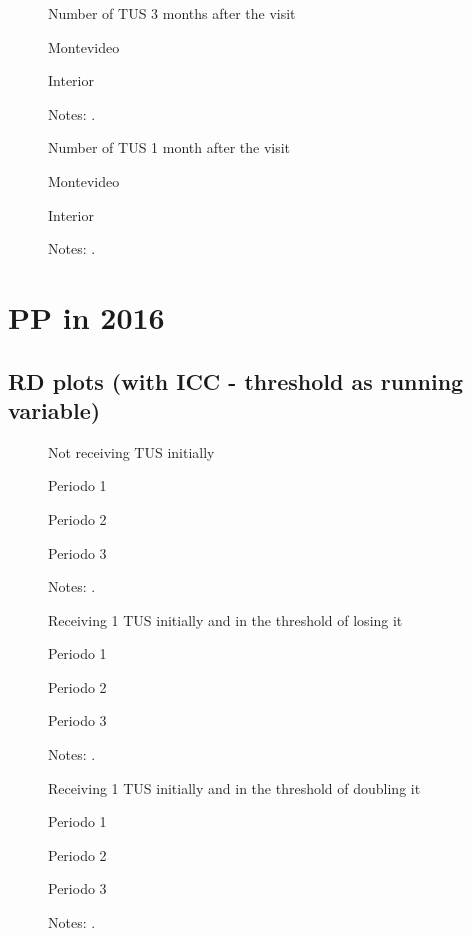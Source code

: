 \documentclass[12pt]{article}
\begin{document}
\begin{figure}[H]%
	\caption{Number of TUS 3 months after the visit}%
	\centering
	\caption*{ {Montevideo}}
	\qquad
	\caption*{Interior}
	\label{fig:first_stage_2018_tus3}%
	\caption*{ {\footnotesize Notes: .}}
\end{figure}

\begin{figure}[H]%
	\caption{Number of TUS 1 month after the visit}%
	\centering
	\caption*{ {Montevideo}}
	\qquad
	\caption*{Interior}
	\label{fig:first_stage_2018_tus1}%
	\caption*{ {\footnotesize Notes: .}}
\end{figure}

\section{PP in 2016}

\subsection{RD plots (with ICC - threshold as running variable)}
\begin{figure}[H]%
	\caption{Not receiving TUS initially}%
	\centering
	\caption*{ {Periodo 1}}
	\caption*{Periodo 2}
	\qquad
	\caption*{Periodo 3}
	\label{fig:pp2016_prim_0TUS.png}%
	\caption*{ {\footnotesize Notes: .}}
\end{figure}

\begin{figure}[H]%
	\caption{Receiving 1 TUS initially and in the threshold of losing it}%
	\centering
	\caption*{ {Periodo 1}}
	\qquad
	\caption*{Periodo 2}
	\qquad
	\caption*{Periodo 3}
	\label{fig:pp2016_prim_1TUS.png}%
	\caption*{ {\footnotesize Notes: .}}
\end{figure}

\begin{figure}[H]%
	\caption{Receiving 1 TUS initially and in the threshold of doubling it}%
	\centering
	\caption*{ {Periodo 1}}
	\qquad
	\caption*{Periodo 2}
	\qquad
	\caption*{Periodo 3}
	\label{fig:pp2016_seg_1TUS.png}%
	\caption*{ {\footnotesize Notes: .}}
\end{figure}
\end{document}
